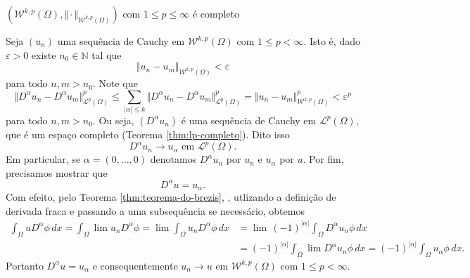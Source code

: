 \documentclass[a4paper, 11pt]{book}
\theoremstyle{definition}
\newcommand{\bN}{\mathbb{N}}
\newcommand{\cL}{\mathcal{L}}
\newcommand{\cW}{\mathcal{W}}
\begin{document}
\begin{tbox}
    $(\cW^{k,p}(\Omega), \Vert \cdot \Vert_{\cW^{k,p}(\Omega)})$ com $1 \leqslant p \leqslant \infty$ é completo
\end{tbox}
\begin{prf}
    Seja $(u_n)$ uma sequência de Cauchy em $\cW^{k,p}(\Omega)$ com $1 \leqslant p < \infty$. Isto é, dado $\varepsilon > 0$ existe $n_0 \in \bN$ tal que
    \[
        \Vert u_n - u_m \Vert_{\cW^{k,p}(\Omega)} < \varepsilon
    \]
    para todo $n,m > n_0$.
    Note que
    \[
        \Vert D^\alpha u_n - D^\alpha u_m \Vert_{\cL^p(\Omega)}^p \leqslant \sum_{|\alpha| \leqslant k} \Vert D^\alpha u_n - D^\alpha u_m \Vert_{\cL^p(\Omega)}^p = \Vert u_n - u_m \Vert_{\cW^{k,p}(\Omega)}^p < \varepsilon^p
    \]
    para todo $n,m > n_0$. Ou seja, $(D^\alpha u_n)$ é uma sequência de Cauchy em $\cL^p(\Omega)$, que é um espaço completo (Teorema \ref{thm:lp-completo}). 
    Dito isso
    \[
        D^\alpha u_n \to u_\alpha \text{ em } \cL^p(\Omega).
    \]
    Em particular, se $\alpha = (0,\dots,0)$ denotamos $D^\alpha u_n$ por $u_n$ e $u_\alpha$ por $u$.
    Por fim, precisamos mostrar que
    \[
        D^\alpha u = u_\alpha.
    \]
Com efeito, pelo Teorema \ref{thm:teorema-do-brezis}, , utlizando a definição de derivada fraca e passando a uma subsequência se necessário, obtemos
    \[
        \begin{aligned}
            \int_\Omega u D^\alpha \phi \, dx 
            = \int_\Omega \lim u_n D^\alpha \phi 
            = \lim\! \int_\Omega u_n D^\alpha \phi \,dx
            &= \lim\, (-1)^{|\alpha|}\!\int_\Omega  D^\alpha u_n \phi\,dx \\
            &= (-1)^{|\alpha|}\!\int_\Omega \lim D^\alpha u_n \phi \,dx 
            = (-1)^{|\alpha|}\!\int_\Omega u_\alpha \phi \,dx.
        \end{aligned}
    \]
    Portanto $D^\alpha u = u_\alpha$ e consequentemente $u_n \to u$ em $\cW^{k,p}(\Omega)$ com $1 \leqslant p < \infty$.


\end{prf}
\end{document}
